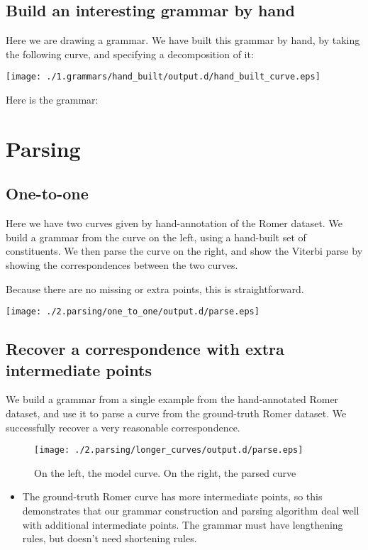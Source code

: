 \documentclass{book}
\begin{document}
\subsection{Build an interesting grammar by hand}
\label{sec-2_2_2}


Here we are drawing a grammar. We have built this grammar by hand, by
taking the following curve, and specifying a decomposition of it:

\texttt{[image: ./1.grammars/hand\_built/output.d/hand\_built\_curve.eps]}

Here is the grammar:


\section{Parsing}
\label{sec-2_3}
\subsection{One-to-one}
\label{sec-2_3_1}


Here we have two curves given by hand-annotation of the Romer
dataset. We build a grammar from the curve on the left, using a
hand-built set of constituents. We then parse the curve on the right,
and show the Viterbi parse by showing the correspondences between the
two curves.

Because there are no missing or extra points, this is straightforward.

\texttt{[image: ./2.parsing/one\_to\_one/output.d/parse.eps]}
\subsection{Recover a correspondence with extra intermediate points}
\label{sec-2_3_2}


We build a grammar from a single example from the hand-annotated Romer
dataset, and use it to parse a curve from the ground-truth Romer
dataset. We successfully recover a very reasonable correspondence.

\begin{figure}[htb]
\centering
\texttt{[image: ./2.parsing/longer\_curves/output.d/parse.eps]}
\caption{On the left, the model curve. On the right, the parsed curve}
\end{figure}


\begin{itemize}
\item The ground-truth Romer curve has more intermediate points, so this
    demonstrates that our grammar construction and parsing algorithm
    deal well with additional intermediate points. The grammar must
    have lengthening rules, but doesn't need shortening rules.
\end{itemize}
\end{document}
